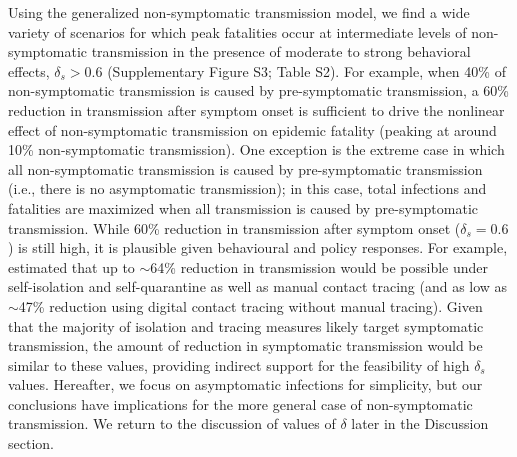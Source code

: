\documentclass[12pt]{article}
\begin{document}
Using the generalized non-symptomatic transmission model, we find a wide variety of scenarios for which peak fatalities occur at intermediate levels of non-symptomatic transmission in the presence of moderate to strong behavioral effects, $\delta_s > 0.6$ (Supplementary Figure S3; Table S2).
For example, when 40\% of non-symptomatic transmission is caused by pre-symptomatic transmission, a 60\% reduction in transmission after symptom onset is sufficient to drive the nonlinear effect of non-symptomatic transmission on epidemic fatality (peaking at around 10\% non-symptomatic transmission).
One exception is the extreme case in which all non-symptomatic transmission is caused by pre-symptomatic transmission (i.e., there is no asymptomatic transmission);
in this case, total infections and fatalities are maximized when all transmission is caused by pre-symptomatic transmission. 
While 60\% reduction in transmission after symptom onset ($\delta_s = 0.6$) is still high, it is plausible given behavioural and policy responses.
For example, \cite{kucharski2020effectiveness} estimated that up to $\sim$64\% reduction in transmission would be possible under self-isolation and self-quarantine as well as manual contact tracing (and as low as $\sim$47\% reduction using digital contact tracing without manual tracing).
Given that the majority of isolation and tracing measures likely target symptomatic transmission, the amount of reduction in symptomatic transmission would be similar to these values, providing indirect support for the feasibility of high $\delta_s$ values. 
Hereafter, we focus on asymptomatic infections for simplicity, but our conclusions have implications for the more general case of non-symptomatic transmission.
We return to the discussion of values of $\delta$ later in the Discussion section.
\end{document}

